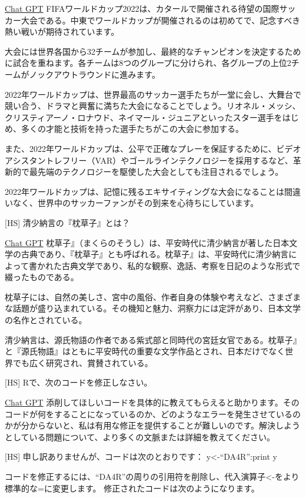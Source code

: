 \documentclass[
]{book}
\theoremstyle{definition}
\theoremstyle{definition}
\theoremstyle{definition}
\theoremstyle{definition}
\theoremstyle{remark}
\begin{document}
\protect\hyperlink{chatgpt}{Chat GPT} FIFAワールドカップ2022は、カタールで開催される待望の国際サッカー大会である。中東でワールドカップが開催されるのは初めてで、記念すべき熱い戦いが期待されています。

大会には世界各国から32チームが参加し、最終的なチャンピオンを決定するために試合を重ねます。各チームは8つのグループに分けられ、各グループの上位2チームがノックアウトラウンドに進みます。

2022年ワールドカップは、世界最高のサッカー選手たちが一堂に会し、大舞台で競い合う、ドラマと興奮に満ちた大会になることでしょう。リオネル・メッシ、クリスティアーノ・ロナウド、ネイマール・ジュニアといったスター選手をはじめ、多くの才能と技術を持った選手たちがこの大会に参加する。

また、2022年ワールドカップは、公平で正確なプレーを保証するために、ビデオアシスタントレフリー（VAR）やゴールラインテクノロジーを採用するなど、革新的で最先端のテクノロジーを駆使した大会としても注目されるでしょう。

2022年ワールドカップは、記憶に残るエキサイティングな大会になることは間違いなく、世界中のサッカーファンがその到来を心待ちにしています。

{[}HS{]} 清少納言の『枕草子』とは？

\protect\hyperlink{chatgpt}{Chat GPT} 枕草子』（まくらのそうし）は、平安時代に清少納言が著した日本文学の古典であり、『枕草子』とも呼ばれる。枕草子』は、平安時代に清少納言によって書かれた古典文学であり、私的な観察、逸話、考察を日記のような形式で綴ったものである。

枕草子には、自然の美しさ、宮中の風俗、作者自身の体験や考えなど、さまざまな話題が盛り込まれている。その機知と魅力、洞察力には定評があり、日本文学の名作とされている。

清少納言は、源氏物語の作者である紫式部と同時代の宮廷女官である。枕草子』と『源氏物語』はともに平安時代の重要な文学作品とされ、日本だけでなく世界でも広く研究され、賞賛されている。

{[}HS{]} Rで、次のコードを修正しなさい。

\protect\hyperlink{chatgpt}{Chat GPT} 添削してほしいコードを具体的に教えてもらえると助かります。そのコードが何をすることになっているのか、どのようなエラーを発生させているのかが分からないと、私は有用な修正を提供することが難しいのです。解決しようとしている問題について、より多くの文脈または詳細を教えてください。

{[}HS{]} 申し訳ありませんが、コードは次のとおりです： y\textless-``DA4R'':print y

コードを修正するには、``DA4R''の周りの引用符を削除し、代入演算子\textless-をより標準的な=に変更します。 修正されたコードは次のようになります。
\end{document}
